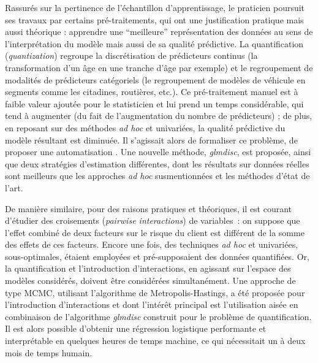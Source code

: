 Rassurés sur la pertinence de l'échantillon d'apprentissage, le praticien poursuit ses travaux par certains pré-traitements, qui ont une justification pratique mais aussi théorique : apprendre une ``meilleure'' représentation des données au sens de l'interprétation du modèle mais aussi de sa qualité prédictive. La quantification (\textit{quantization}) regroupe la discrétisation de prédicteurs continus (la transformation d'un âge en une tranche d'âge par exemple) et le regroupement de modalités de prédicteurs catégoriels (le regroupement de modèles de véhicule en segments comme les citadines, routières, etc.). Ce pré-traitement manuel est à faible valeur ajoutée pour le statisticien et lui prend un temps considérable, qui tend à augmenter (du fait de l'augmentation du nombre de prédicteurs) ; de plus, en reposant sur des méthodes \textit{ad hoc} et univariées, la qualité prédictive du modèle résultant est diminuée. Il s'agissait alors de formaliser ce problème, de proposer une automatisation . Une nouvelle méthode, \textit{glmdisc}, est proposée, ainsi que deux stratégies d'estimation différentes, dont les résultats sur données réelles sont meilleurs que les approches \textit{ad hoc} susmentionnées et les méthodes d'état de l'art.

\medskip

De manière similaire, pour des raisons pratiques et théoriques, il est courant d'étudier des croisements (\textit{pairwise interactions}) de variables~: on suppose que l'effet combiné de deux facteurs sur le risque du client est différent de la somme des effets de ces facteurs. Encore une fois, des techniques \textit{ad hoc} et univariées, sous-optimales, étaient employées et pré-supposaient des données quantifiées. Or, la quantification et l'introduction d'interactions, en agissant sur l'espace des modèles considérés, doivent être considérées simultanément. Une approche de type MCMC, utilisant l'algorithme de Metropolis-Hastings, a été proposée pour l'introduction d'interactions et dont l'intérêt principal est l'utilisation aisée en combinaison de l'algorithme \textit{glmdisc} construit pour le problème de quantification. Il est alors possible d'obtenir une régression logistique performante et interprétable en quelques heures de temps machine, ce qui nécessitait un à deux mois de temps humain.

\medskip

